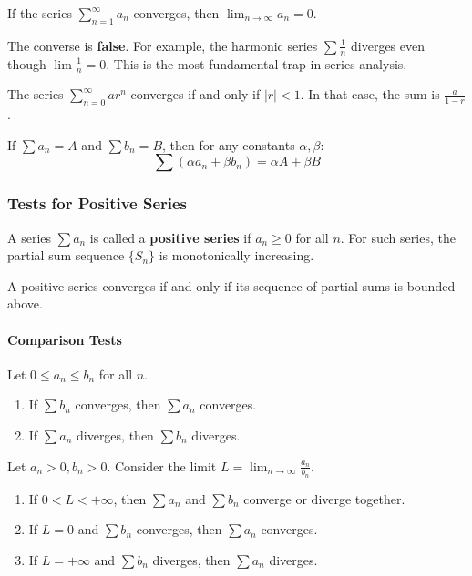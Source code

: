 \begin{theorem}
If the series $\sum_{n=1}^{\infty} a_n$ converges, then $\lim_{n \to \infty} a_n = 0$.
\end{theorem}
\begin{remark}
The converse is \textbf{false}. For example, the harmonic series $\sum \frac{1}{n}$ diverges even though $\lim \frac{1}{n} = 0$. This is the most fundamental trap in series analysis.
\end{remark}

\begin{example}
The series $\sum_{n=0}^{\infty} ar^n$ converges if and only if $|r| < 1$. In that case, the sum is $\frac{a}{1-r}$.
\end{example}

\begin{property}[Linearity]
If $\sum a_n = A$ and $\sum b_n = B$, then for any constants $\alpha, \beta$:
\[ \sum (\alpha a_n + \beta b_n) = \alpha A + \beta B \]
\end{property}

\subsubsection{Tests for Positive Series}

A series $\sum a_n$ is called a \textbf{positive series} if $a_n \ge 0$ for all $n$.
For such series, the partial sum sequence $\{S_n\}$ is monotonically increasing.
\begin{theorem}
A positive series converges if and only if its sequence of partial sums is bounded above.
\end{theorem}

\paragraph{Comparison Tests}
\begin{theorem}
Let $0 \le a_n \le b_n$ for all $n$.
\begin{enumerate}
    \item If $\sum b_n$ converges, then $\sum a_n$ converges.
    \item If $\sum a_n$ diverges, then $\sum b_n$ diverges.
\end{enumerate}
\end{theorem}

\begin{theorem}
Let $a_n > 0, b_n > 0$. Consider the limit $L = \lim_{n \to \infty} \frac{a_n}{b_n}$.
\begin{enumerate}
    \item If $0 < L < +\infty$, then $\sum a_n$ and $\sum b_n$ converge or diverge together.
    \item If $L = 0$ and $\sum b_n$ converges, then $\sum a_n$ converges.
    \item If $L = +\infty$ and $\sum b_n$ diverges, then $\sum a_n$ diverges.
\end{enumerate}
\end{theorem}

